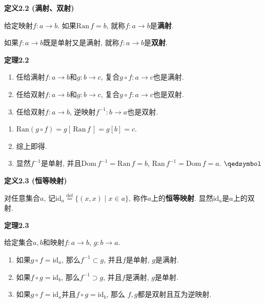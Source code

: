 \documentclass[UTF8]{ctexart}
\begin{document}
\hypertarget{sec:定义2.2}{}
\noindent\textbf{定义2.2 (满射、双射)}

给定映射$f:a\to b$. 如果$\mathrm{Ran}\,f=b$, 就称$f:a\to b$是\textbf{满射}.

如果$f:a\to b$既是单射又是满射, 就称$f:a\to b$是\textbf{双射}.

\vspace{10pt}

\hypertarget{sec:定理2.2}{}
\noindent\textbf{定理2.2}

\begin{enumerate}
    \item 任给满射$f:a\to b$和$g:b\to c$, 复合$g\circ f:a\to c$也是满射.
    \item 任给双射$f:a\to b$和$g:b\to c$, 复合$g\circ f:a\to c$也是双射.
    \item 任给双射$f:a\to b$, 逆映射$f^{-1}:b\to a$也是双射.
\end{enumerate}


\begin{enumerate}
    \item $\mathrm{Ran}(g\circ f)=g[\,\mathrm{Ran}\,f\,]=g[b]=c$.
    \item 综上即得.
    \item 显然$f^{-1}$是单射, 并且$\mathrm{Dom}\,f^{-1}=\mathrm{Ran}\,f=b$,
    $\mathrm{Ran}\,f^{-1}=\mathrm{Dom}\,f=a$. \hfill $\qedsymbol$
\end{enumerate}

\vspace{10pt}

\hypertarget{sec:定义2.3}{}
\noindent\textbf{定义2.3 (恒等映射)}

对任意集合$a$, 记$\mathrm{id}_a\overset{\mathrm{def}}{=}\{(x,x)\mid x\in a\}$,
称作$a$上的\textbf{恒等映射}. 显然$\mathrm{id}_a$是$a$上的双射.

\vspace{10pt}

\hypertarget{sec:定理2.3}{}
\noindent\textbf{定理2.3}

给定集合$a,b$和映射$f:a\to b$, $g:b\to a$.
\begin{enumerate}
    \item 如果$g\circ f=\mathrm{id}_a$, 那么$f^{-1}\subset g$,
    并且$f$是单射, $g$是满射.
    \item 如果$f\circ g=\mathrm{id}_b$, 那么$f^{-1}\supset g$,
    并且$f$是满射, $g$是单射.
    \item 如果$g\circ f=\mathrm{id}_a$并且$f\circ g=\mathrm{id}_b$, 那么
    $f,g$都是双射且互为逆映射.
\end{enumerate}
\end{document}
